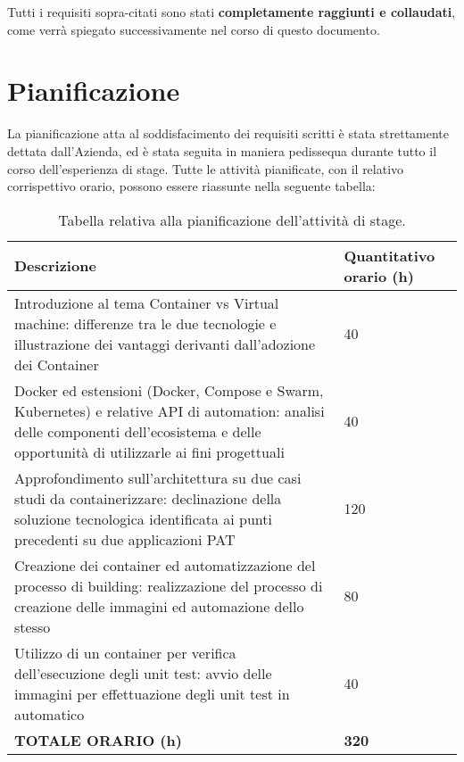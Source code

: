 Tutti i requisiti sopra-citati sono stati \textbf{completamente raggiunti e collaudati}, come verrà spiegato successivamente nel corso di questo documento.

\newpage
\section{Pianificazione}
La pianificazione atta al soddisfacimento dei requisiti scritti è stata strettamente dettata dall'Azienda, ed è stata seguita in maniera pedissequa durante tutto il corso dell'esperienza di stage.
Tutte le attività pianificate, con il relativo corrispettivo orario, possono essere riassunte nella seguente tabella:
\begin{table}[h!]
\centering
    \renewcommand{\arraystretch}{1.5}
    \begin{tabular}{|m{25em} | m{}|} 
    \hline
        \hfil \textbf{Descrizione} & \hfil \textbf{Quantitativo orario (h)} \\
    \hline\hline
        \hfil Introduzione al tema Container vs Virtual machine: differenze tra le due tecnologie e illustrazione dei vantaggi derivanti dall'adozione dei Container & 40 \\ 
    \hline
       \hfil Docker ed estensioni (Docker, Compose e Swarm, Kubernetes) e relative API di automation: analisi delle componenti dell'ecosistema e delle opportunità di utilizzarle ai fini progettuali & 40 \\
    \hline
        \hfil Approfondimento sull'architettura su due casi studi da containerizzare: declinazione della soluzione tecnologica identificata ai punti precedenti su due applicazioni PAT & 120 \\
    \hline
        \hfil Creazione dei container ed automatizzazione del processo di building: realizzazione del processo di creazione delle immagini ed automazione dello stesso & 80 \\
    \hline
        \hfil Utilizzo di un container per verifica dell'esecuzione degli unit test: avvio delle immagini per effettuazione degli unit test in automatico & 40 \\ [1ex] 
   \hline
    \textbf{TOTALE ORARIO (h)} & \textbf{320}\\
    \hline
    \end{tabular}
\medskip
\caption{Tabella relativa alla pianificazione dell'attività di stage.}
\label{table:tabella relativa alla pianificazione dello stage stabilita dall'Azienda}
\end{table}






